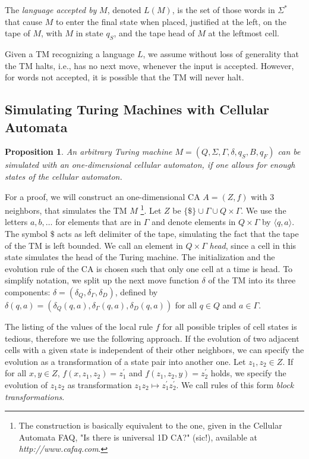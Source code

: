 \documentclass[pre,amssymb,showpacs,showkeys,preprint]{revtex4}
\newtheorem{prop}{Proposition}
\begin{document}
The \emph{language accepted by} $M$, denoted $L(M)$, is the set of those words in $\Sigma^*$
that cause $M$ to enter the final state when placed, justified at the left, on the tape of $M$,
with $M$ in state $q_S$, and the tape head of $M$ at the leftmost cell.

Given a TM recognizing a language $L$, we assume without loss of generality that the TM halts, i.e.,
has no next move, whenever the input is accepted.
However, for words not accepted, it is possible that the TM will never halt.

\subsection{Simulating Turing Machines with Cellular Automata}
\label{sec-sim-tm-with-ca}

\begin{prop}
An arbitrary Turing machine $M = (Q, \Sigma, \Gamma, \delta, q_S, B, q_F)$ can be simulated with an
one-dimensional cellular automaton, if one allows for enough states of the
cellular automaton.
\end{prop}

For a proof, we will construct an one-dimensional CA $A=(Z,f)$ with 3 neighbors, that simulates the
TM $M$ \footnote{The construction is basically equivalent to the one, given in the Cellular Automata FAQ,
"Is there is universal 1D CA?" (sic!), available at \emph{http://www.cafaq.com}.}.
Let $Z$ be $\{\$\} \cup \Gamma \cup Q \times \Gamma$.
We use the letters $a, b, \ldots$ for elements that are in $\Gamma$ and
denote elements in $Q \times \Gamma$ by $\langle q,a \rangle$.
The symbol $\$$ acts as left delimiter of the tape, simulating the fact that the tape of the TM is
left bounded.
We call an element in $Q \times \Gamma$ \emph{head}, since a cell in this state simulates the
head of the Turing machine.
The initialization and the evolution rule of the CA is chosen such that only one cell at a time is head.
To simplify notation, we split up the next move function $\delta$ of the TM into its three
components:
$\delta = (\delta_Q, \delta_\Gamma, \delta_D)$, defined by
$\delta(q,a) = (\delta_Q(q,a), \delta_\Gamma(q,a), \delta_D(q,a))$ for all $q \in Q$ and
$a \in \Gamma$.

The listing of the values of the local rule $f$ for all possible triples of cell states is tedious,
therefore we use the following approach.
If the evolution of two adjacent cells with a given state is independent of their other neighbors,
we can specify the evolution as a transformation of a state pair into another one.
Let $z_1, z_2 \in Z$.
If for  all $x, y \in Z$, $f(x, z_1, z_2) = z_1^\prime$ and $f(z_1, z_2, y) = z_2^\prime$ holds,
we specify the evolution of $z_1z_2$ as transformation $z_1z_2 \mapsto z_1^\prime z_2^\prime$.
We call rules of this form \emph{block transformations}.
\end{document}
